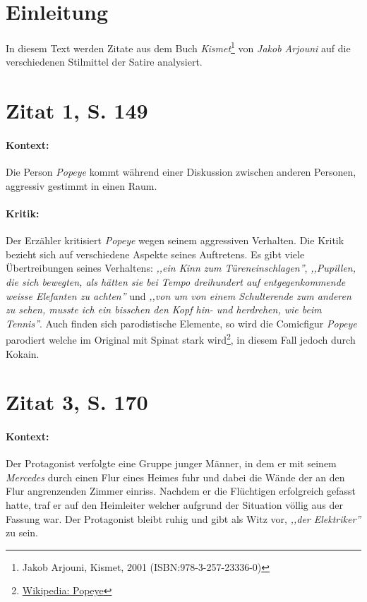 \documentclass[12pt,twoside,a4paper]{article}
\title{\titleText}
\author{\authorText}
\date{\dateText}
\begin{document}
	\maketitle
	\tableofcontents
	
	\section{Einleitung}
	
	In diesem Text werden Zitate aus dem Buch \textit{Kismet}\footnote{Jakob Arjouni, Kismet, 2001 (ISBN:978-3-257-23336-0)} von \textit{Jakob Arjouni} auf die verschiedenen Stilmittel der Satire analysiert.
	
	\section{Zitat 1, S. 149}
	
	\paragraph{Kontext:} Die Person \textit{Popeye} kommt während einer Diskussion zwischen anderen Personen, aggressiv gestimmt in einen Raum.
	
	\paragraph{Kritik:} Der Erzähler kritisiert \textit{Popeye} wegen seinem aggressiven Verhalten. Die Kritik bezieht sich auf verschiedene Aspekte seines Auftretens. Es gibt viele Übertreibungen seines Verhaltens: \textit{,,ein Kinn zum Türeneinschlagen''}, \textit{,,Pupillen, die sich bewegten, als hätten sie bei Tempo dreihundert  auf entgegenkommende weisse Elefanten zu achten''} und \textit{,,von um von einem Schulterende zum anderen zu sehen, musste ich ein bisschen den Kopf hin- und herdrehen, wie beim Tennis''}. Auch finden sich parodistische Elemente, so wird die Comicfigur \textit{Popeye} parodiert welche im Original mit Spinat stark wird\footnote{\href{https://de.wikipedia.org/wiki/Popeye}{Wikipedia: Popeye}}, in diesem Fall jedoch durch Kokain.
	
	
	\section{Zitat 3, S. 170}
	
	\paragraph{Kontext:} Der Protagonist verfolgte eine Gruppe junger Männer, in dem er mit seinem \textit{Mercedes} durch einen Flur eines Heimes fuhr und dabei die Wände der an den Flur angrenzenden Zimmer einriss. Nachdem er die Flüchtigen erfolgreich gefasst hatte, traf er auf den Heimleiter welcher aufgrund der Situation völlig aus der Fassung war. Der Protagonist bleibt ruhig und gibt als Witz vor, \textit{,,der Elektriker''} zu sein.
	
\end{document}
